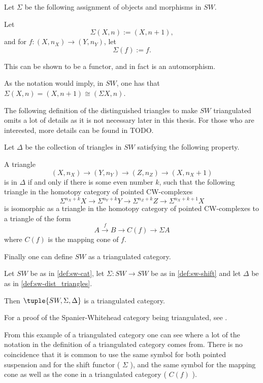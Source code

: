 \begin{definition}
    \label{def:sw-shift}
    Let \( \Sigma \) be the following assignment of objects and morphisms in \( SW \).

    Let
    \[
        \Sigma(X, n) := (X, n + 1),
    \] 
    and for \( f: (X, n_X) \to (Y, n_Y) \), let
    \[
        \Sigma(f) := f.
    \]

    This can be shown to be a functor, and in fact is an automorphism.
\end{definition}

As the notation would imply, in \( SW \), one has that \( \Sigma(X, n) = (X, n + 1) \cong ( \Sigma X, n ) \).

The following definition of the distinguished triangles to make \( SW \) triangulated omits a lot of details as it is not necessary later in this thesis. For those who are interested, more details can be found in TODO.

\begin{definition}
    \label{def:sw-dist_triangles}
    Let \( \Delta \) be the collection of triangles in \( SW \) satisfying the following property.

    A triangle
    \[
        (X, n_X) \to (Y, n_Y) \to (Z, n_Z) \to (X, n_X + 1)
    \]
    is in \( \Delta \) if and only if there is some even number \( k \), such that the following triangle in the homotopy category of pointed CW-complexes
    \[
        \Sigma^{n_X + k} X \to \Sigma^{n_Y + k} Y \to \Sigma^{n_Z + k} Z \to \Sigma^{n_X + k + 1} X
    \]
    is isomorphic as a triangle in the homotopy category of pointed CW-complexes to a triangle of the form
    \[
        A \stackrel{f}{\to} B \to C(f) \to \Sigma A
    \]
    where \( C(f) \) is the mapping cone of \( f \).
\end{definition}

Finally one can define \( SW \) as a triangulated category.

\begin{example}
    Let \( SW \) be as in \autoref{def:sw-cat}, let \( \Sigma: SW \to SW \) be as in \autoref{def:sw-shift} and let \( \Delta \) be as in \autoref{def:sw-dist_triangles}.

    Then \( \tuple{SW, \Sigma, \Delta} \) is a triangulated category.
\end{example}

For a proof of the Spanier-Whitehead category being triangulated, see \cite[Theorem 5.9]{Daria_Bachelor}.

From this example of a triangulated category one can see where a lot of the notation in the definition of a triangulated category comes from. There is no coincidence that it is common to use the same symbol for both pointed suspension and for the shift functor ( \( \Sigma \) ), and the same symbol for the mapping cone as well as the cone in a triangulated category ( \( C(f) \) ).
